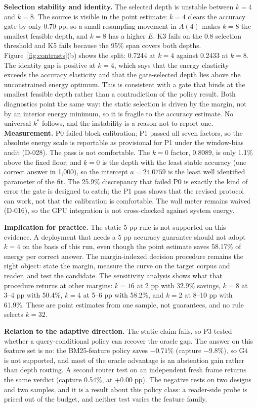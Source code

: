\documentclass[a4paper,fleqn]{cas-sc}
\begin{document}
\textbf{Selection stability and identity.} The selected depth is unstable between $k=4$ and $k=8$. The source is visible in the point estimate: $k=4$ clears the accuracy gate by only 0.70 pp, so a small resampling movement in $A(4)$ makes $k=8$ the smallest feasible depth, and $k=8$ has a higher $E$. K3 fails on the 0.8 selection threshold and K5 fails because the 95\% span covers both depths. Figure~\ref{fig:contrasts}(b) shows the split: 0.7244 at $k=4$ against 0.2433 at $k=8$. The identity gap is positive at $k=4$, which says that the energy elasticity exceeds the accuracy elasticity and that the gate-selected depth lies above the unconstrained energy optimum. This is consistent with a gate that binds at the smallest feasible depth rather than a contradiction of the policy result. Both diagnostics point the same way: the static selection is driven by the margin, not by an interior energy minimum, so it is fragile to the accuracy estimate. No universal $k^{*}$ follows, and the instability is a reason not to report one. \textbf{Measurement.} P0 failed block calibration; P1 passed all seven factors, so the absolute energy scale is reportable as provisional for P1 under the window-bias audit (D-028). The pass is not comfortable. The $k=0$ factor, 0.8089, is only 1.1\% above the fixed floor, and $k=0$ is the depth with the least stable accuracy (one correct answer in 1{,}000), so the intercept $a=24.0759$ is the least well identified parameter of the fit. The 25.9\% discrepancy that failed P0 is exactly the kind of error the gate is designed to catch; the P1 pass shows that the revised protocol can work, not that the calibration is comfortable. The wall meter remains waived (D-016), so the GPU integration is not cross-checked against system energy.

\textbf{Implication for practice.} The static 5 pp rule is not supported on this evidence. A deployment that needs a 5 pp accuracy guarantee should not adopt $k=4$ on the basis of this run, even though the point estimate saves 58.17\% of energy per correct answer. The margin-indexed decision procedure remains the right object: state the margin, measure the curve on the target corpus and reader, and test the candidate. The sensitivity analysis shows what that procedure returns at other margins: $k=16$ at 2 pp with 32.9\% savings, $k=8$ at 3--4 pp with 50.4\%, $k=4$ at 5--6 pp with 58.2\%, and $k=2$ at 8--10 pp with 61.9\%. These are point estimates from one sample, not guarantees, and no rule selects $k=32$.

\textbf{Relation to the adaptive direction.} The static claim fails, so P3 tested whether a query-conditional policy can recover the oracle gap. The answer on this feature set is no: the BM25-feature policy saves $-0.71\%$ (capture $-9.8\%$), so G4 is not supported, and most of the oracle advantage is an abstention gain rather than depth routing. A second router test on an independent fresh frame returns the same verdict (capture 0.54\%, at $+0.00$ pp). The negative rests on two designs and two samples, and it is a result about this policy class: a reader-side probe is priced out of the budget, and neither test varies the feature family.
\end{document}
